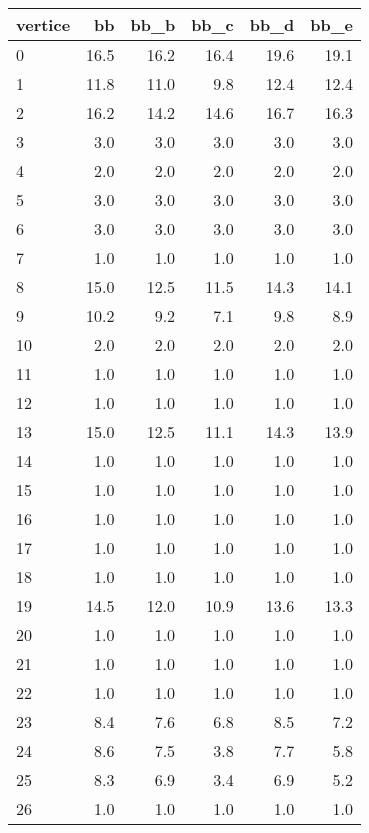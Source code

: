 \begin{tabular}{lrrrrr}
\toprule
vertice &    bb &  bb\_b &  bb\_c &  bb\_d &  bb\_e \\
\midrule
      0 &  16.5 &  16.2 &  16.4 &  19.6 &  19.1 \\
      1 &  11.8 &  11.0 &   9.8 &  12.4 &  12.4 \\
      2 &  16.2 &  14.2 &  14.6 &  16.7 &  16.3 \\
      3 &   3.0 &   3.0 &   3.0 &   3.0 &   3.0 \\
      4 &   2.0 &   2.0 &   2.0 &   2.0 &   2.0 \\
      5 &   3.0 &   3.0 &   3.0 &   3.0 &   3.0 \\
      6 &   3.0 &   3.0 &   3.0 &   3.0 &   3.0 \\
      7 &   1.0 &   1.0 &   1.0 &   1.0 &   1.0 \\
      8 &  15.0 &  12.5 &  11.5 &  14.3 &  14.1 \\
      9 &  10.2 &   9.2 &   7.1 &   9.8 &   8.9 \\
     10 &   2.0 &   2.0 &   2.0 &   2.0 &   2.0 \\
     11 &   1.0 &   1.0 &   1.0 &   1.0 &   1.0 \\
     12 &   1.0 &   1.0 &   1.0 &   1.0 &   1.0 \\
     13 &  15.0 &  12.5 &  11.1 &  14.3 &  13.9 \\
     14 &   1.0 &   1.0 &   1.0 &   1.0 &   1.0 \\
     15 &   1.0 &   1.0 &   1.0 &   1.0 &   1.0 \\
     16 &   1.0 &   1.0 &   1.0 &   1.0 &   1.0 \\
     17 &   1.0 &   1.0 &   1.0 &   1.0 &   1.0 \\
     18 &   1.0 &   1.0 &   1.0 &   1.0 &   1.0 \\
     19 &  14.5 &  12.0 &  10.9 &  13.6 &  13.3 \\
     20 &   1.0 &   1.0 &   1.0 &   1.0 &   1.0 \\
     21 &   1.0 &   1.0 &   1.0 &   1.0 &   1.0 \\
     22 &   1.0 &   1.0 &   1.0 &   1.0 &   1.0 \\
     23 &   8.4 &   7.6 &   6.8 &   8.5 &   7.2 \\
     24 &   8.6 &   7.5 &   3.8 &   7.7 &   5.8 \\
     25 &   8.3 &   6.9 &   3.4 &   6.9 &   5.2 \\
     26 &   1.0 &   1.0 &   1.0 &   1.0 &   1.0 \\

\end{tabular}
